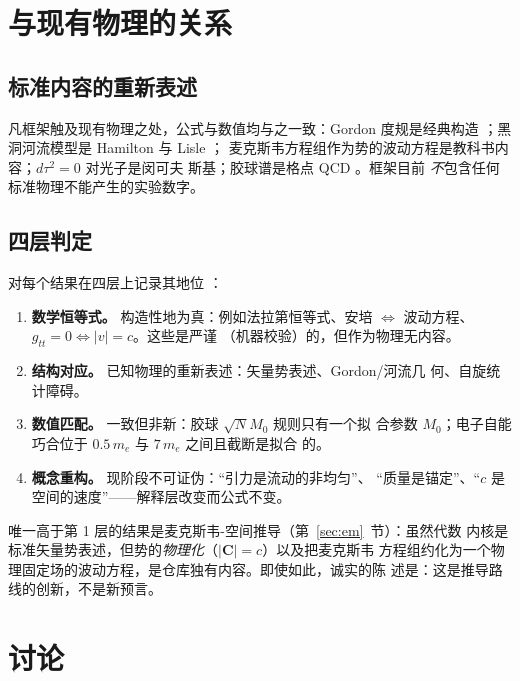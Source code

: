 \documentclass[aps,prd,preprint,superscriptaddress,amsmath,amssymb]{revtex4-2}
\begin{document}
\section{与现有物理的关系}\label{sec:relation}

\subsection{标准内容的重新表述}

凡框架触及现有物理之处，公式与数值均与之一致：Gordon 度规是经典构造
\cite{Gordon1923}；黑洞河流模型是 Hamilton 与 Lisle \cite{HamiltonLisle2008}；
麦克斯韦方程组作为势的波动方程是教科书内容；$d\tau^2=0$ 对光子是闵可夫
斯基；胶球谱是格点 QCD \cite{MorningstarPeardon1999,Chen2006}。框架目前
\emph{不}包含任何标准物理不能产生的实验数字。

\subsection{四层判定}\label{sec:status}

对每个结果在四层上记录其地位 \cite{ProjectionPhysics-status}：

\begin{enumerate}
  \item \textbf{数学恒等式。} 构造性地为真：例如法拉第恒等式、安培
  $\Leftrightarrow$ 波动方程、$g_{tt}=0 \Leftrightarrow |v|=c$。这些是严谨
  （机器校验）的，但作为物理无内容。
  \item \textbf{结构对应。} 已知物理的重新表述：矢量势表述、Gordon/河流几
  何、自旋统计障碍。
  \item \textbf{数值匹配。} 一致但非新：胶球 $\sqrt{N}M_0$ 规则只有一个拟
  合参数 $M_0$；电子自能巧合位于 $0.5\,m_e$ 与 $7\,m_e$ 之间且截断是拟合
  的。
  \item \textbf{概念重构。} 现阶段不可证伪：``引力是流动的非均匀''、
  ``质量是锚定''、``$c$ 是空间的速度''——解释层改变而公式不变。
\end{enumerate}

唯一高于第 1 层的结果是麦克斯韦-空间推导（第~\ref{sec:em}~节）：虽然代数
内核是标准矢量势表述，但势的\emph{物理化}（$|\bm{C}|=c$）以及把麦克斯韦
方程组约化为一个物理固定场的波动方程，是仓库独有内容。即使如此，诚实的陈
述是：这是推导路线的创新，不是新预言。

\section{讨论}\label{sec:discussion}
\end{document}
